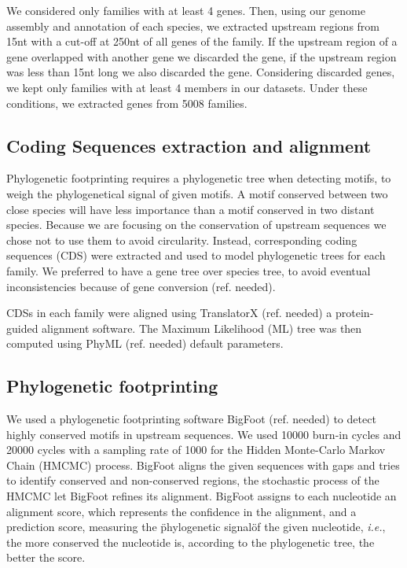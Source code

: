We considered only families with at least 4 genes. Then, using our genome assembly and annotation of each species, we extracted upstream regions from 15nt with a cut-off at 250nt of all genes of the family. If the upstream region of a gene overlapped with another gene we discarded the gene, if the upstream region was less than 15nt long we also discarded the gene. Considering discarded genes, we kept only families with at least 4 members in our datasets. Under these conditions, we extracted genes from 5008 families.

\subsection*{Coding Sequences extraction and alignment}

Phylogenetic footprinting requires a phylogenetic tree when detecting motifs, to weigh the phylogenetical signal of given motifs. A motif conserved between two close species will have less importance than a motif conserved in two distant species. Because we are focusing on the conservation of upstream sequences we chose not to use them to avoid circularity. Instead, corresponding coding sequences (CDS) were extracted and used to model phylogenetic trees for each family. We preferred to have a gene tree over species tree, to avoid eventual inconsistencies because of gene conversion (ref. needed).

CDSs in each family were aligned using TranslatorX (ref. needed) a protein-guided alignment software. The Maximum Likelihood (ML) tree was then computed using PhyML (ref. needed) default parameters.

\subsection*{Phylogenetic footprinting}

We used a phylogenetic footprinting software BigFoot (ref. needed) to detect highly conserved motifs in upstream sequences. We used 10000 burn-in cycles and 20000 cycles with a sampling rate of 1000 for the Hidden Monte-Carlo Markov Chain (HMCMC) process. BigFoot aligns the given sequences with gaps and tries to identify conserved and non-conserved regions, the stochastic process of the HMCMC let BigFoot refines its alignment. BigFoot assigns to each nucleotide an alignment score, which represents the confidence in the alignment, and a prediction score, measuring the \"phylogenetic signal\" of the given nucleotide, \textit{i.e.}, the more conserved the nucleotide is, according to the phylogenetic tree, the better the score.

